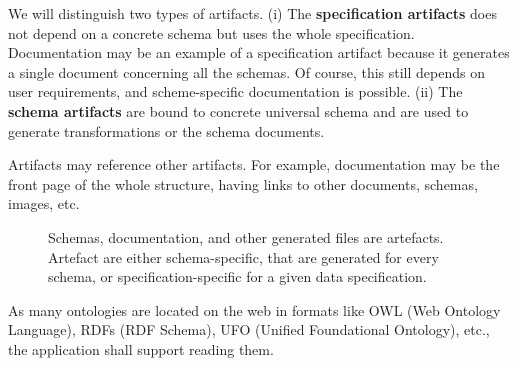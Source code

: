 We will distinguish two types of artifacts. (i) The \textbf{specification artifacts} does not depend on a concrete schema but uses the whole specification. Documentation may be an example of a specification artifact because it generates a single document concerning all the schemas. Of course, this still depends on user requirements, and scheme-specific documentation is possible. (ii) The \textbf{schema artifacts} are bound to concrete universal schema and are used to generate transformations or the schema documents.

Artifacts may reference other artifacts. For example, documentation may be the front page of the whole structure, having links to other documents, schemas, images, etc.

\begin{figure}[h!]\centering
    \caption{Schemas, documentation, and other generated files are artefacts. Artefact are either schema-specific, that are generated for every schema, or specification-specific for a given data specification.}
\end{figure}



\begin{requirement}
    \label{requirement:ontologies-on-the-web}
    As many ontologies are located on the web in formats like OWL (Web Ontology Language), RDFs (RDF Schema), UFO (Unified Foundational Ontology), etc., the application shall support reading them.
\end{requirement}

